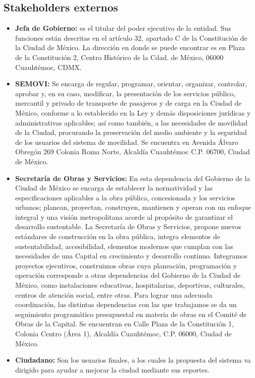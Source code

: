 \documentclass[12pt,twoside]{article}
\begin{document}
\subsection{Stakeholders externos}
\begin{itemize}
    \item \textbf{Jefa de Gobierno: }es el titular del poder ejecutivo de la entidad.
        Sus funciones están descritas en el artículo 32, apartado C de la Constitución
        de la Ciudad de México. La dirección en donde se puede encontrar es en Plaza 
        de la Constitución 2, Centro Histórico de la Cdad. de México, 06000 
        Cuauhtémoc, CDMX.
    \item \textbf{SEMOVI: }Se encarga de regular, programar, orientar, organizar, 
        controlar, aprobar y, en su caso, modificar, la presentación de los servicios 
        público, mercantil y privado de transporte de pasajeros y de carga en la 
        Ciudad de México, conforme a lo establecido en la Ley y demás disposiciones 
        jurídicas y administrativas aplicables; así como también, a las necesidades de 
        movilidad de la Ciudad, procurando la preservación del medio ambiente y la 
        seguridad de los usuarios del sistema de movilidad. Se encuentra en Avenida 
        Álvaro Obregón 269 Colonia Roma Norte, Alcaldía Cuauhtémoc C.P. 06700, Ciudad 
        de México.
    \item \textbf{Secretaría de Obras y Servicios: }En esta dependencia del Gobierno 
        de la Ciudad de México se encarga de establecer la normatividad y las 
        especificaciones aplicables a la obra pública, concesionada y los servicios 
        urbanos; planean, proyectan, construyen, mantienen y operan con un 
        enfoque integral y una visión metropolitana acorde al propósito de garantizar 
        el desarrollo sustentable. La Secretaría de Obras y Servicios, propone nuevos 
        estándares de construcción en la obra pública, integra elementos de sustentabilidad, 
        accesibilidad, elementos modernos que cumplan con las necesidades de una Capital 
        en crecimiento y desarrollo continuo. Integramos proyectos ejecutivos, construimos 
        obras cuya planeación, programación y operación corresponde a otras dependencias 
        del Gobierno de la Ciudad de México, como instalaciones educativas, hospitalarias, 
        deportivas, culturales, centros de atención social, entre otras. Para lograr una 
        adecuada coordinación, las distintas dependencias con las que trabajamos se da 
        un seguimiento programático presupuestal en materia de obras en el Comité de Obras 
        de la Capital. Se encuentran en Calle Plaza de la Constitución 1, Colonia Centro 
        (Área 1), Alcaldía Cuauhtémoc, C.P. 06000, Ciudad de México.
    \item \textbf{Ciudadano: }Son los usuarios finales, a los cuales la propuesta del 
        sistema va dirigido para ayudar a mejorar la ciudad mediante sus reportes.
\end{itemize}
\end{document}
